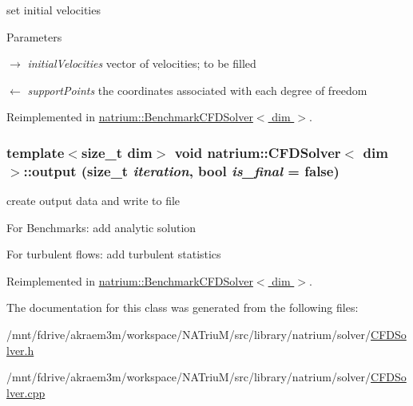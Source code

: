 set initial velocities 
\begin{DoxyParams}{Parameters}
\item[\mbox{$\rightarrow$} {\em initialVelocities}]vector of velocities; to be filled \item[\mbox{$\leftarrow$} {\em supportPoints}]the coordinates associated with each degree of freedom \end{DoxyParams}


Reimplemented in \hyperlink{classnatrium_1_1BenchmarkCFDSolver_a7883dcfd4469ae65ae62cad09ae5d160}{natrium::BenchmarkCFDSolver$<$ dim $>$}.\hypertarget{classnatrium_1_1CFDSolver_abd1bdd31bac002516e4184f50bf8a547}{
\subsubsection[{output}]{\setlength{\rightskip}{0pt plus 5cm}template$<$size\_\-t dim$>$ void {\bf natrium::CFDSolver}$<$ dim $>$::output (size\_\-t {\em iteration}, \/  bool {\em is\_\-final} = {\ttfamily false})}}
\label{classnatrium_1_1CFDSolver_abd1bdd31bac002516e4184f50bf8a547}


create output data and write to file 

For Benchmarks: add analytic solution

For turbulent flows: add turbulent statistics 

Reimplemented in \hyperlink{classnatrium_1_1BenchmarkCFDSolver_a9d63cc1e2fe66301533713d4f1ce43a6}{natrium::BenchmarkCFDSolver$<$ dim $>$}.

The documentation for this class was generated from the following files:\begin{DoxyCompactItemize}
\item 
/mnt/fdrive/akraem3m/workspace/NATriuM/src/library/natrium/solver/\hyperlink{CFDSolver_8h}{CFDSolver.h}\item 
/mnt/fdrive/akraem3m/workspace/NATriuM/src/library/natrium/solver/\hyperlink{CFDSolver_8cpp}{CFDSolver.cpp}\end{DoxyCompactItemize}
